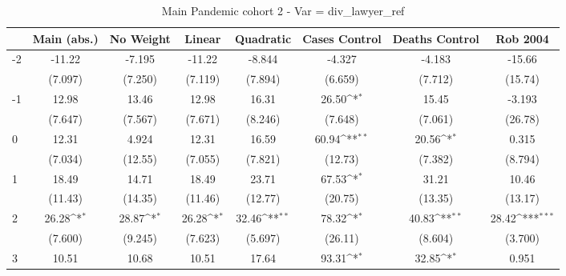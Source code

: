 \documentclass{article}
\begin{document}
{
\def\sym#1{\ifmmode^{#1}\else\(^{#1}\)\fi}
\begin{longtable}{l*{7}{c}}
\caption{Main Pandemic cohort 2 - Var = div\_lawyer\_ref}\\
\hline\hline\endfirsthead\hline\endhead\hline\endfoot\endlastfoot
                &\multicolumn{1}{c}{Main (abs.)}&\multicolumn{1}{c}{No Weight}&\multicolumn{1}{c}{Linear}&\multicolumn{1}{c}{Quadratic}&\multicolumn{1}{c}{Cases Control}&\multicolumn{1}{c}{Deaths Control}&\multicolumn{1}{c}{Rob 2004}\\
\hline
-2              &   -11.22         &   -7.195         &   -11.22         &   -8.844         &   -4.327         &   -4.183         &   -15.66         \\
                &  (7.097)         &  (7.250)         &  (7.119)         &  (7.894)         &  (6.659)         &  (7.712)         &  (15.74)         \\
-1              &    12.98         &    13.46         &    12.98         &    16.31         &    26.50\sym{*}  &    15.45         &   -3.193         \\
                &  (7.647)         &  (7.567)         &  (7.671)         &  (8.246)         &  (7.648)         &  (7.061)         &  (26.78)         \\
0               &    12.31         &    4.924         &    12.31         &    16.59         &    60.94\sym{**} &    20.56\sym{*}  &    0.315         \\
                &  (7.034)         &  (12.55)         &  (7.055)         &  (7.821)         &  (12.73)         &  (7.382)         &  (8.794)         \\
1               &    18.49         &    14.71         &    18.49         &    23.71         &    67.53\sym{*}  &    31.21         &    10.46         \\
                &  (11.43)         &  (14.35)         &  (11.46)         &  (12.77)         &  (20.75)         &  (13.35)         &  (13.17)         \\
2               &    26.28\sym{*}  &    28.87\sym{*}  &    26.28\sym{*}  &    32.46\sym{**} &    78.32\sym{*}  &    40.83\sym{**} &    28.42\sym{***}\\
                &  (7.600)         &  (9.245)         &  (7.623)         &  (5.697)         &  (26.11)         &  (8.604)         &  (3.700)         \\
3               &    10.51         &    10.68         &    10.51         &    17.64         &    93.31\sym{*}  &    32.85\sym{*}  &    0.951         \\

\end{longtable}}
\end{document}
